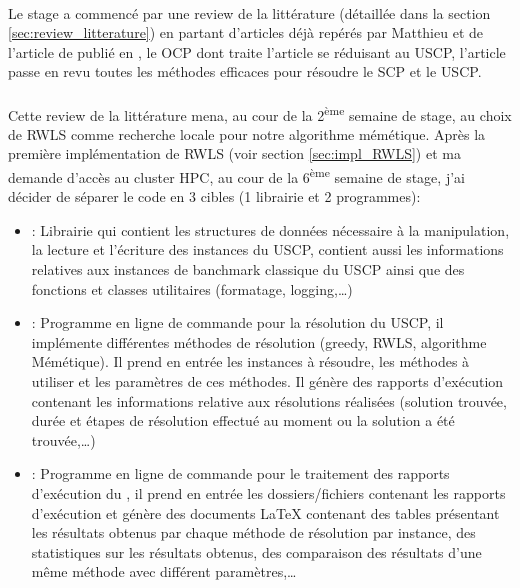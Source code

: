 \documentclass[a4paper,11pt,twoside,french,report]{../common/simplem}
\begin{document}
				\paragraph*{}
					Le stage a commencé par une review de la littérature (détaillée dans la section \ref{sec:review_litterature}) en partant d'articles déjà repérés par Matthieu et de l'article  de \citeauthor{Kritter2019} publié en \citeyear{Kritter2019}, le \gls{OCP} dont traite l'article se réduisant au \gls{USCP}, l'article passe en revu toutes les méthodes efficaces pour résoudre le \gls{SCP} et le \gls{USCP}.
				\paragraph*{}
					Cette review de la littérature mena, au cour de la 2\textsuperscript{ème} semaine de stage, au choix de \gls{RWLS} comme recherche locale pour notre algorithme mémétique. Après la première implémentation de \gls{RWLS} (voir section \ref{sec:impl_RWLS}) et ma demande d'accès au cluster \gls{HPC}, au cour de la 6\textsuperscript{ème} semaine de stage, j'ai décider de séparer le code en 3 cibles (1 librairie et 2 programmes):
					\begin{itemize}
						\item \common{}: Librairie qui contient les structures de données nécessaire à la manipulation, la lecture et l'écriture des instances du \gls{USCP}, contient aussi les informations relatives aux instances de banchmark classique du \gls{USCP} ainsi que des fonctions et classes utilitaires (formatage, logging,\ldots)
						\item \solver{}: Programme en ligne de commande pour la résolution du \gls{USCP}, il implémente différentes méthodes de résolution (greedy, \gls{RWLS}, algorithme Mémétique). Il prend en entrée les instances à résoudre, les méthodes à utiliser et les paramètres de ces méthodes. Il génère des rapports d'exécution contenant les informations relative aux résolutions réalisées (solution trouvée, durée et étapes de résolution effectué au moment ou la solution a été trouvée,\ldots)
						\item \printer{}: Programme en ligne de commande pour le traitement des rapports d'exécution du \solver{}, il prend en entrée les dossiers/fichiers contenant les rapports d'exécution et génère des documents \LaTeX{} contenant des tables présentant les résultats obtenus par chaque méthode de résolution par instance, des statistiques sur les résultats obtenus, des comparaison des résultats d'une même méthode avec différent paramètres,\ldots
					\end{itemize}
\end{document}
